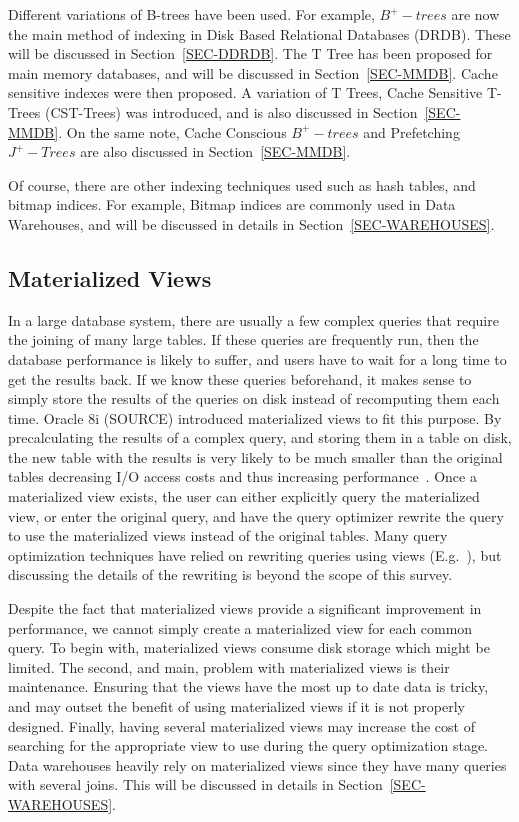 \documentclass[12pt,a4paper]{article}
\begin{document}
Different variations of B-trees have been used. For example, $B^{+}-trees$ are now the main method of indexing in Disk Based Relational Databases (DRDB). These
will be discussed in Section~\ref{SEC-DDRDB}. The T Tree has been proposed for main memory databases, and will be discussed in Section~\ref{SEC-MMDB}. Cache
sensitive indexes were then proposed. A variation of T Trees, Cache Sensitive T-Trees (CST-Trees) was introduced, and is also discussed in
Section~\ref{SEC-MMDB}. On the same note, Cache Conscious $B^{+}-trees$ and Prefetching $J^{+}-Trees$ are also discussed in Section~\ref{SEC-MMDB}. 


Of course, there are other indexing techniques used such as hash tables, and bitmap indices. For example, Bitmap indices are commonly used in Data Warehouses,
and will be discussed in details in Section~\ref{SEC-WAREHOUSES}.


\subsection{Materialized Views}

In a large database system, there are usually a few complex queries that require the joining of many large tables. If these queries are frequently run, then the
database performance is likely to suffer, and users have to wait for a long time to get the results back. If we know these queries beforehand, it makes sense to
simply store the results of the queries on disk instead of recomputing them each time. Oracle 8i (SOURCE) introduced materialized views to fit this purpose. By
precalculating the
results of a complex query, and storing them in a table on disk, the new table with the results is very likely to be much smaller than the original tables
decreasing I/O access costs and thus increasing performance~\cite{lightstone2007physical, chaudhuri1998overview}. Once a materialized view exists, the user can
either explicitly query the materialized view, or enter the original query, and have the query optimizer rewrite the query to use the materialized views instead
of the original tables. Many query optimization techniques have relied on rewriting queries using views (E.g.~\cite{levy1995answering, gupta1995aggregate,
goldstein2001optimizing,
abiteboul1998complexity}), but discussing the details of the rewriting is beyond the scope of this survey.


Despite the fact that materialized views provide a significant improvement in performance, we cannot simply create a materialized view for each common query. To
begin with, materialized views consume disk storage which might be limited. The second, and main, problem with materialized views is their maintenance. Ensuring
that the views have the most up to date data is tricky, and may outset the benefit of using materialized views if it is not properly designed. Finally, having
several materialized views may increase the cost of searching for the appropriate view to use during the query optimization stage. Data warehouses heavily rely
on materialized views since they have many queries with several joins. This will be discussed in details in Section~\ref{SEC-WAREHOUSES}.
\end{document}
